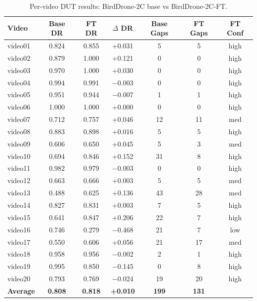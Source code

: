 \documentclass[12pt,a4paper]{report}
\begin{document}
\begin{table}[H]
\centering
\caption{Per-video DUT results: BirdDrone-2C base vs BirdDrone-2C-FT.}
\label{tab:per_video}
\small
\begin{tabular}{|l|c|c|c|c|c|c|}
\hline
\textbf{Video} & \textbf{Base DR} & \textbf{FT DR} & \textbf{$\Delta$ DR} & \textbf{Base Gaps} & \textbf{FT Gaps} & \textbf{FT Conf} \\
\hline
video01 & 0.824 & 0.855 & +0.031 & 5  & 5  & high \\
\hline
video02 & 0.879 & 1.000 & +0.121 & 0  & 0  & high \\
\hline
video03 & 0.970 & 1.000 & +0.030 & 0  & 0  & high \\
\hline
video04 & 0.994 & 0.991 & $-$0.003 & 0  & 0  & high \\
\hline
video05 & 0.951 & 0.944 & $-$0.007 & 1  & 1  & high \\
\hline
video06 & 1.000 & 1.000 & +0.000 & 0  & 0  & high \\
\hline
video07 & 0.712 & 0.757 & +0.046 & 12 & 11 & med \\
\hline
video08 & 0.883 & 0.898 & +0.016 & 5  & 5  & high \\
\hline
video09 & 0.606 & 0.650 & +0.045 & 5  & 3  & med \\
\hline
video10 & 0.694 & 0.846 & +0.152 & 31 & 8  & high \\
\hline
video11 & 0.982 & 0.979 & $-$0.003 & 0  & 0  & high \\
\hline
video12 & 0.663 & 0.666 & +0.003 & 5  & 5  & med \\
\hline
video13 & 0.488 & 0.625 & +0.136 & 43 & 28 & med \\
\hline
video14 & 0.827 & 0.831 & +0.003 & 7  & 5  & high \\
\hline
video15 & 0.641 & 0.847 & +0.206 & 22 & 7  & high \\
\hline
video16 & 0.746 & 0.279 & $-$0.468 & 21 & 7  & low \\
\hline
video17 & 0.550 & 0.606 & +0.056 & 21 & 17 & med \\
\hline
video18 & 0.958 & 0.956 & $-$0.002 & 2  & 1  & high \\
\hline
video19 & 0.995 & 0.850 & $-$0.145 & 0  & 8  & high \\
\hline
video20 & 0.793 & 0.769 & $-$0.024 & 19 & 20 & high \\
\hline
\textbf{Average} & \textbf{0.808} & \textbf{0.818} & \textbf{+0.010} & \textbf{199} & \textbf{131} & \\
\hline
\end{tabular}
\end{table}
\end{document}
